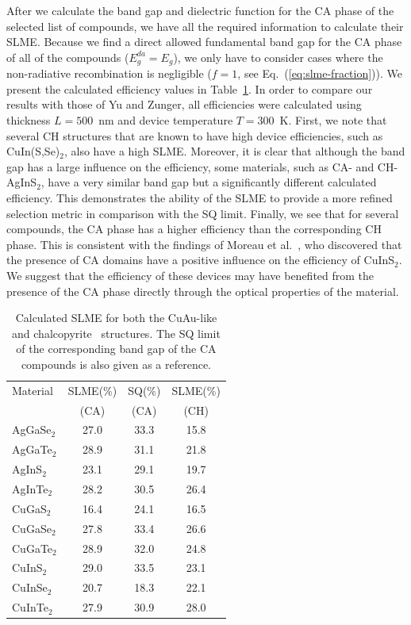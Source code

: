 \begin{refsection}
After we calculate the band gap and dielectric function for the CA phase of the selected list of compounds, we have all the required information to calculate their SLME. Because we find a direct allowed fundamental band gap for the CA phase of all of the compounds ($E_g^{da}=E_g$), we only have to consider cases where the non-radiative recombination is negligible ($f = 1$, see Eq.~(\ref{eq:slme-fraction})). We present the calculated efficiency values in Table~\ref{tab:slme-SLME}. In order to compare our results with those of Yu and Zunger, all efficiencies were calculated using thickness $L = 500$~\si{\nano\meter} and device temperature \mbox{$T = 300$~\si{\kelvin}}. First, we note that several CH structures that are known to have high device efficiencies, such as CuIn(S,Se)$_{2}$, also have a high SLME. Moreover, it is clear that although the band gap has a large influence on the efficiency, some materials, such as CA- and \mbox{CH-AgInS$_2$}, have a very similar band gap but a significantly different calculated efficiency. This demonstrates the ability of the SLME to provide a more refined selection metric in comparison with the SQ limit. Finally, we see that for several compounds, the CA phase has a higher efficiency than the corresponding CH phase. This is consistent with the findings of Moreau et al.~\cite{Moreau2015}, who discovered that the presence of CA domains have a positive influence on the efficiency of CuInS$_2$. We suggest that the efficiency of these devices may have benefited from the presence of the CA phase directly through the optical properties of the material.

\begin{table}[htbp]
\renewcommand{\arraystretch}{1.3}
\centering
\caption{Calculated SLME for both the \mbox{CuAu-like} and chalcopyrite~\cite{Yu2012} structures. The SQ limit of the corresponding band gap of the CA compounds is also given as a reference.}
\label{tab:slme-SLME}
\begin{tabular}{l@{\hskip 2em}c@{\hskip 1em}c@{\hskip 1em}c}
\hline
Material & SLME(\%) & SQ(\%) & SLME(\%)\\
		 &  (CA)	&  (CA) &  (CH)	 \\\hline
AgGaSe$_2$ & 27.0 & 33.3 & 15.8 \\
AgGaTe$_2$ & 28.9 & 31.1 & 21.8 \\
AgInS$_2$  & 23.1 & 29.1 & 19.7 \\
AgInTe$_2$ & 28.2 & 30.5 & 26.4 \\
CuGaS$_2$  & 16.4 & 24.1 & 16.5 \\
CuGaSe$_2$ & 27.8 & 33.4 & 26.6 \\
CuGaTe$_2$ & 28.9 & 32.0 & 24.8 \\
CuInS$_2$  & 29.0 & 33.5 & 23.1 \\
CuInSe$_2$ & 20.7 & 18.3 & 22.1 \\
CuInTe$_2$ & 27.9 & 30.9 & 28.0 \\ \hline
\end{tabular}
\end{table}


\end{refsection}
